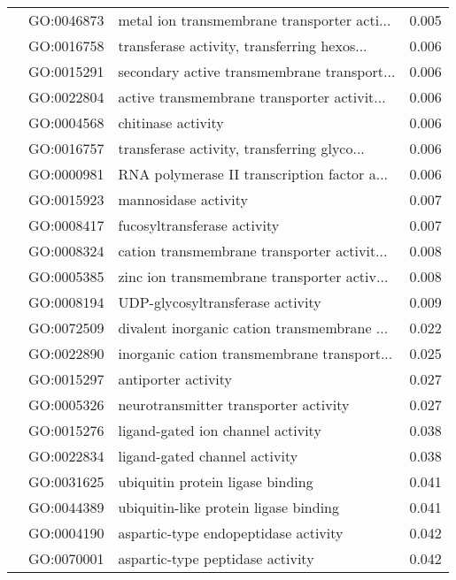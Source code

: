 \begin{longtable}{lllr}
   & GO:0046873 &  metal ion transmembrane transporter acti... &         0.005 \\
   & GO:0016758 &  transferase activity, transferring hexos... &         0.006 \\
   & GO:0015291 &  secondary active transmembrane transport... &         0.006 \\
   & GO:0022804 &  active transmembrane transporter activit... &         0.006 \\
   & GO:0004568 &                           chitinase activity &         0.006 \\
   & GO:0016757 &  transferase activity, transferring glyco... &         0.006 \\
   & GO:0000981 &  RNA polymerase II transcription factor a... &         0.006 \\
   & GO:0015923 &                         mannosidase activity &         0.007 \\
   & GO:0008417 &                  fucosyltransferase activity &         0.007 \\
   & GO:0008324 &  cation transmembrane transporter activit... &         0.008 \\
   & GO:0005385 &  zinc ion transmembrane transporter activ... &         0.008 \\
   & GO:0008194 &             UDP-glycosyltransferase activity &         0.009 \\
   & GO:0072509 &  divalent inorganic cation transmembrane ... &         0.022 \\
   & GO:0022890 &  inorganic cation transmembrane transport... &         0.025 \\
   & GO:0015297 &                          antiporter activity &         0.027 \\
   & GO:0005326 &        neurotransmitter transporter activity &         0.027 \\
   & GO:0015276 &            ligand-gated ion channel activity &         0.038 \\
   & GO:0022834 &                ligand-gated channel activity &         0.038 \\
   & GO:0031625 &             ubiquitin protein ligase binding &         0.041 \\
   & GO:0044389 &        ubiquitin-like protein ligase binding &         0.041 \\
   & GO:0004190 &         aspartic-type endopeptidase activity &         0.042 \\
   & GO:0070001 &             aspartic-type peptidase activity &         0.042 \\

\end{longtable}
